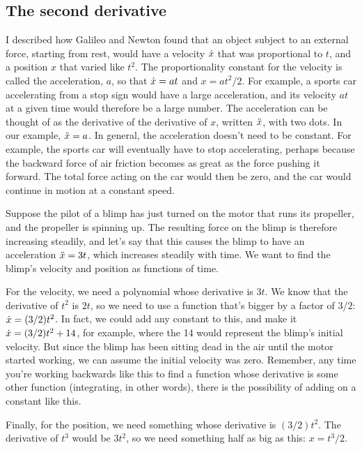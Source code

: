 \subsection{The second derivative}

I described how Galileo and Newton found that an object subject to
an external force, starting from rest, would have a velocity $\dot{x}$ that was
proportional to $t$, and a position $x$ that varied like $t^2$. The proportionality
constant for the velocity is called the acceleration, $a$, so that
$\dot{x}=at$ and $x=at^2/2$. For example, a sports car accelerating from
a stop sign would have a large acceleration, and its velocity $at$ at a given
time would therefore be a large number. The acceleration can be thought of
as the derivative of the derivative of $x$, written $\Ddot{x}$, with two
dots. In our example, $\Ddot{x}=a$. In general, the acceleration doesn't need
to be constant. For example, the sports car will eventually have to stop
accelerating, perhaps because the backward force of air friction becomes as
great as the force pushing it forward. The total force acting on the car would
then be zero, and the car would continue in motion at a constant speed.

\begin{eg}
Suppose the pilot of a blimp has just turned on the motor that runs its propeller, and
the propeller is spinning up. The resulting force on the blimp is therefore increasing
steadily, and let's say that this causes the blimp to have an acceleration
$\Ddot{x}=3t$, which increases steadily with time. We want to find the blimp's
velocity and position as functions of time.

For the velocity, we need a polynomial
whose derivative is $3t$. We know that the derivative of $t^2$ is $2t$, so we need
to use a function that's bigger by a factor of $3/2$: $\dot{x}=(3/2)t^2$. In fact,
we could add any constant to this, and make it $\dot{x}=(3/2)t^2+14$, for example,
where the 14 would represent the blimp's initial velocity. But since the blimp has
been sitting dead in the air until the motor started working, we can assume
the initial velocity was zero. Remember, any time you're working backwards
like this to find a function whose derivative is some other function (integrating,
in other words), there is the possibility of adding on a constant like this.

Finally, for the position, we need something whose derivative is $(3/2)t^2$.
The derivative of $t^3$ would be $3t^2$, so we need something half as big
as this: $x=t^3/2$.
\end{eg}

